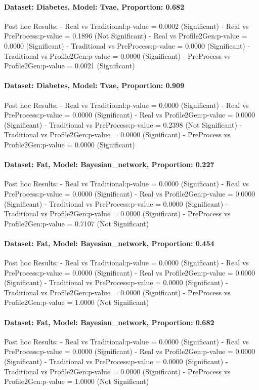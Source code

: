 \documentclass{article}
\theoremstyle{plain}
\theoremstyle{definition}
\theoremstyle{remark}
\begin{document}
\paragraph{Dataset: Diabetes, Model: Tvae, Proportion: 0.682
}Post hoc Results:
- Real vs Traditional:p-value = 0.0002 (Significant)
- Real vs PreProcess:p-value = 0.1896 (Not Significant)
- Real vs Profile2Gen:p-value = 0.0000 (Significant)
- Traditional vs PreProcess:p-value = 0.0000 (Significant)
- Traditional vs Profile2Gen:p-value = 0.0000 (Significant)
- PreProcess vs Profile2Gen:p-value = 0.0021 (Significant)

\paragraph{Dataset: Diabetes, Model: Tvae, Proportion: 0.909
}Post hoc Results:
- Real vs Traditional:p-value = 0.0000 (Significant)
- Real vs PreProcess:p-value = 0.0000 (Significant)
- Real vs Profile2Gen:p-value = 0.0000 (Significant)
- Traditional vs PreProcess:p-value = 0.2398 (Not Significant)
- Traditional vs Profile2Gen:p-value = 0.0000 (Significant)
- PreProcess vs Profile2Gen:p-value = 0.0000 (Significant)

\paragraph{Dataset: Fat, Model: Bayesian\_network, Proportion: 0.227
}Post hoc Results:
- Real vs Traditional:p-value = 0.0000 (Significant)
- Real vs PreProcess:p-value = 0.0000 (Significant)
- Real vs Profile2Gen:p-value = 0.0000 (Significant)
- Traditional vs PreProcess:p-value = 0.0000 (Significant)
- Traditional vs Profile2Gen:p-value = 0.0000 (Significant)
- PreProcess vs Profile2Gen:p-value = 0.7107 (Not Significant)

\paragraph{Dataset: Fat, Model: Bayesian\_network, Proportion: 0.454
}Post hoc Results:
- Real vs Traditional:p-value = 0.0000 (Significant)
- Real vs PreProcess:p-value = 0.0000 (Significant)
- Real vs Profile2Gen:p-value = 0.0000 (Significant)
- Traditional vs PreProcess:p-value = 0.0000 (Significant)
- Traditional vs Profile2Gen:p-value = 0.0000 (Significant)
- PreProcess vs Profile2Gen:p-value = 1.0000 (Not Significant)

\paragraph{Dataset: Fat, Model: Bayesian\_network, Proportion: 0.682
}Post hoc Results:
- Real vs Traditional:p-value = 0.0000 (Significant)
- Real vs PreProcess:p-value = 0.0000 (Significant)
- Real vs Profile2Gen:p-value = 0.0000 (Significant)
- Traditional vs PreProcess:p-value = 0.0000 (Significant)
- Traditional vs Profile2Gen:p-value = 0.0000 (Significant)
- PreProcess vs Profile2Gen:p-value = 1.0000 (Not Significant)
\end{document}
